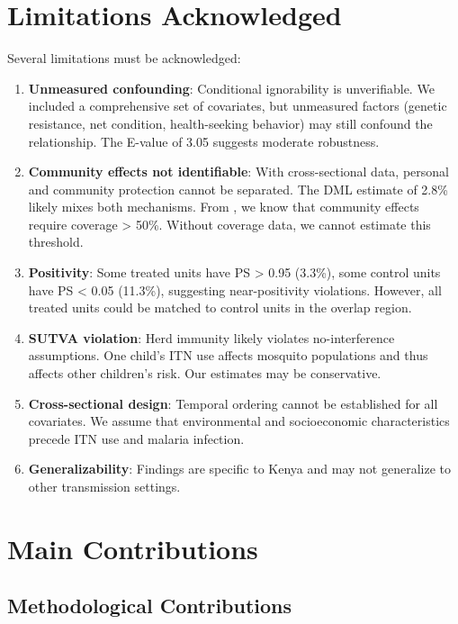\section{Limitations Acknowledged}

Several limitations must be acknowledged:

\begin{enumerate}
	\item \textbf{Unmeasured confounding}: Conditional ignorability is unverifiable. We included a comprehensive set of covariates, but unmeasured factors (genetic resistance, net condition, health-seeking behavior) may still confound the relationship. The E-value of 3.05 suggests moderate robustness.
	
	\item \textbf{Community effects not identifiable}: With cross-sectional data, personal and community protection cannot be separated. The DML estimate of 2.8\% likely mixes both mechanisms. From \citet{hawley2003community}, we know that community effects require coverage > 50\%. Without coverage data, we cannot estimate this threshold.
	
	\item \textbf{Positivity}: Some treated units have PS > 0.95 (3.3\%), some control units have PS < 0.05 (11.3\%), suggesting near-positivity violations. However, all treated units could be matched to control units in the overlap region.
	
	\item \textbf{SUTVA violation}: Herd immunity likely violates no-interference assumptions. One child's ITN use affects mosquito populations and thus affects other children's risk. Our estimates may be conservative.
	
	\item \textbf{Cross-sectional design}: Temporal ordering cannot be established for all covariates. We assume that environmental and socioeconomic characteristics precede ITN use and malaria infection.
	
	\item \textbf{Generalizability}: Findings are specific to Kenya and may not generalize to other transmission settings.
\end{enumerate}

\section{Main Contributions}

\subsection{Methodological Contributions}

